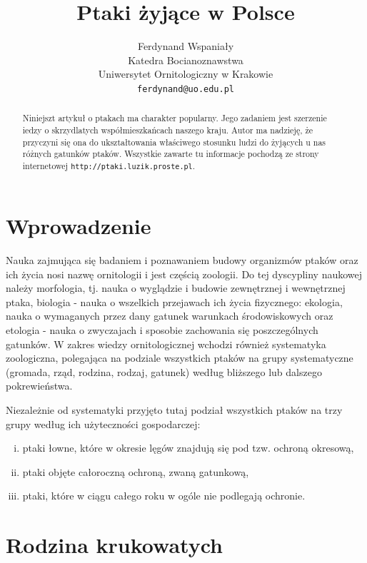 \documentclass[a4paper,12pt,twoside]{article}
\title{Ptaki żyjące w Polsce}
\author{Ferdynand Wspaniały\\
\small Katedra Bocianoznawstwa\\
\small Uniwersytet Ornitologiczny w Krakowie\\
\small \texttt{ferdynand@uo.edu.pl}\\
}
\date{} %
\begin{document}
\maketitle

\tableofcontents

\begin{abstract}
Niniejszt artykuł o ptakach ma charakter popularny. Jego zadaniem jest szerzenie iedzy o skrzydlatych współmieszkańcach naszego kraju. Autor ma nadzieję, że przyczyni się ona do ukształtowania właściwego stosunku ludzi do żyjących u nas różnych gatunków ptaków. Wszystkie zawarte tu informacje pochodzą ze strony internetowej \texttt{http://ptaki.luzik.proste.pl}.
\end{abstract}

\section{Wprowadzenie}

Nauka zajmująca się badaniem i poznawaniem budowy organizmów ptaków oraz ich życia nosi nazwę ornitologii i jest częścią zoologii. Do tej dyscypliny naukowej należy morfologia, tj. nauka o wyglądzie i budowie zewnętrznej i wewnętrznej ptaka, biologia - nauka o wszelkich przejawach ich życia fizycznego: ekologia, nauka o wymaganych przez dany gatunek warunkach środowiskowych oraz etologia - nauka o zwyczajach i sposobie zachowania się poszczególnych gatunków. W zakres wiedzy ornitologicznej wchodzi również systematyka zoologiczna, polegająca na podziale wszystkich ptaków na grupy systematyczne (gromada, rząd, rodzina, rodzaj, gatunek) według bliższego lub dalszego pokrewieństwa.

Niezależnie od systematyki przyjęto tutaj podział wszystkich ptaków na trzy grupy według ich użyteczności gospodarczej:
\begin{enumerate}[i)]
\item ptaki łowne, które w okresie lęgów znajdują się pod tzw. ochroną okresową,
\item ptaki objęte całoroczną ochroną, zwaną gatunkową,
\item ptaki, które w ciągu całego roku w ogóle nie podlegają ochronie.
\end{enumerate}
   

\section{Rodzina krukowatych}
\end{document}

